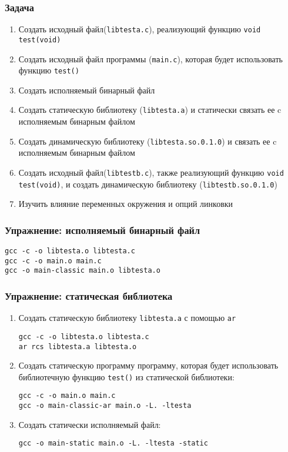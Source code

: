 \begin{frame}[fragile]
	\frametitle{Задача}

	\begin{enumerate}
		\item Создать исходный файл({\tt libtesta.c}), реализующий функцию {\tt void test(void)}
		\item Создать исходный файл программы ({\tt main.c}), которая будет использовать функцию {\tt test()}
		\item Создать исполняемый бинарный файл
		\item Создать статическую библиотеку ({\tt libtesta.a})
			и статически связать ее c исполняемым бинарным файлом
		\item Создать динамическую библиотеку ({\tt libtesta.so.0.1.0})
			и связать ее c исполняемым бинарным файлом
		\item Создать исходный файл({\tt libtestb.c}), также реализующий функцию {\tt void test(void)},
			и создать динамическую библиотеку ({\tt libtestb.so.0.1.0})
		\item Изучить влияние переменных окружения и опций линковки
	\end{enumerate}
\end{frame}

\begin{frame}[fragile]
	\frametitle{Упражнение: исполняемый бинарный файл}

\begin{verbatim}
gcc -c -o libtesta.o libtesta.c
gcc -c -o main.o main.c
gcc -o main-classic main.o libtesta.o
\end{verbatim}
\end{frame}


\begin{frame}[fragile]
	\frametitle{Упражнение: статическая библиотека}

	\begin{enumerate}
		\item Создать статическую библиотеку {\tt libtesta.a} с помощью {\tt ar}

\begin{verbatim}
gcc -c -o libtesta.o libtesta.c
ar rcs libtesta.a libtesta.o
\end{verbatim}
			
		\item Создать статическую программу программу, которая будет использовать 
			библиотечную функцию {\tt test()} из статической библиотеки: 

\begin{verbatim}
gcc -c -o main.o main.c
gcc -o main-classic-ar main.o -L. -ltesta
\end{verbatim}

		\item Создать статически исполняемый файл: 

\begin{verbatim}
gcc -o main-static main.o -L. -ltesta -static
\end{verbatim}

	\end{enumerate}
\end{frame}


